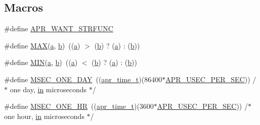 \subsection*{Macros}
\begin{DoxyCompactItemize}
\item 
\#define \hyperlink{group__Cache__util_ga88a4bf7f483aad3f3945773f3383e713}{A\+P\+R\+\_\+\+W\+A\+N\+T\+\_\+\+S\+T\+R\+F\+U\+NC}
\item 
\#define \hyperlink{group__Cache__util_gafa99ec4acc4ecb2dc3c2d05da15d0e3f}{M\+AX}(\hyperlink{pcre_8txt_a841271aab70f5cda9412a19c7753f02c}{a},  \hyperlink{group__APR__Util__Bucket__Brigades_ga11dc1bdeac74315dbed17465c98879e9}{b})~((\hyperlink{pcre_8txt_a841271aab70f5cda9412a19c7753f02c}{a}) $>$ (\hyperlink{group__APR__Util__Bucket__Brigades_ga11dc1bdeac74315dbed17465c98879e9}{b}) ? (\hyperlink{pcre_8txt_a841271aab70f5cda9412a19c7753f02c}{a}) \+: (\hyperlink{group__APR__Util__Bucket__Brigades_ga11dc1bdeac74315dbed17465c98879e9}{b}))
\item 
\#define \hyperlink{group__Cache__util_ga3acffbd305ee72dcd4593c0d8af64a4f}{M\+IN}(\hyperlink{pcre_8txt_a841271aab70f5cda9412a19c7753f02c}{a},  \hyperlink{group__APR__Util__Bucket__Brigades_ga11dc1bdeac74315dbed17465c98879e9}{b})~((\hyperlink{pcre_8txt_a841271aab70f5cda9412a19c7753f02c}{a}) $<$ (\hyperlink{group__APR__Util__Bucket__Brigades_ga11dc1bdeac74315dbed17465c98879e9}{b}) ? (\hyperlink{pcre_8txt_a841271aab70f5cda9412a19c7753f02c}{a}) \+: (\hyperlink{group__APR__Util__Bucket__Brigades_ga11dc1bdeac74315dbed17465c98879e9}{b}))
\item 
\#define \hyperlink{group__Cache__util_ga11c1c155b3b983d8a53ee6f62d054c5c}{M\+S\+E\+C\+\_\+\+O\+N\+E\+\_\+\+D\+AY}~((\hyperlink{group__apr__time_gadb4bde16055748190eae190c55aa02bb}{apr\+\_\+time\+\_\+t})(86400$\ast$\hyperlink{group__apr__time_gab4dd3f3015d25a50f3be3e0e91043abf}{A\+P\+R\+\_\+\+U\+S\+E\+C\+\_\+\+P\+E\+R\+\_\+\+S\+EC})) /$\ast$ one day, \hyperlink{group__apr__thread__proc_ga2e46fea00cc2238744ebca5061c62bcc}{in} microseconds $\ast$/
\item 
\#define \hyperlink{group__Cache__util_ga99f59d6743883a270e59e4d49616b054}{M\+S\+E\+C\+\_\+\+O\+N\+E\+\_\+\+HR}~((\hyperlink{group__apr__time_gadb4bde16055748190eae190c55aa02bb}{apr\+\_\+time\+\_\+t})(3600$\ast$\hyperlink{group__apr__time_gab4dd3f3015d25a50f3be3e0e91043abf}{A\+P\+R\+\_\+\+U\+S\+E\+C\+\_\+\+P\+E\+R\+\_\+\+S\+EC}))  /$\ast$ one hour, \hyperlink{group__apr__thread__proc_ga2e46fea00cc2238744ebca5061c62bcc}{in} microseconds $\ast$/
\item 

\end{DoxyCompactItemize}
